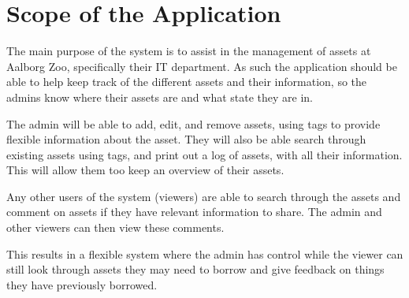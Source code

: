 \section{Scope of the Application}\label{sc:scope}
The main purpose of the system is to assist in the management of assets at Aalborg Zoo, specifically their IT department. As such the application should be able to help keep track of the different assets and their information, so the admins know where their assets are and what state they are in. 
\par
The admin will be able to add, edit, and remove assets, using tags to provide flexible information about the asset. They will also be able search through existing assets using tags, and print out a log of assets, with all their information. This will allow them too keep an overview of their assets. 
\par
Any other users of the system (viewers) are able to search through the assets and comment on assets if they have relevant information to share. The admin and other viewers can then view these comments. 
\par
This results in a flexible system where the admin has control while the viewer can still look through assets they may need to borrow and give feedback on things they have previously borrowed. 